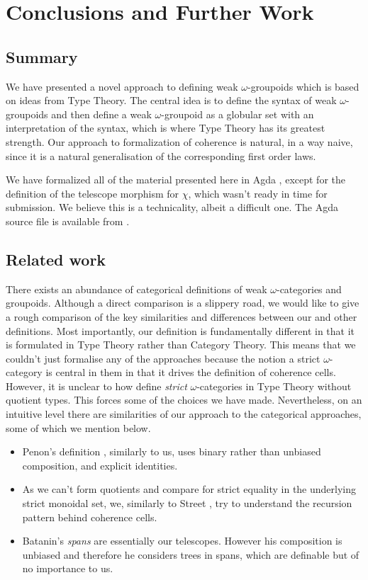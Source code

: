 \section{Conclusions and Further Work}
\label{sec:conclusions}

\subsection{Summary}
We have presented a novel approach to defining weak $\omega$-groupoids
which is based on ideas from Type Theory. The central idea is to
define the syntax of weak $\omega$-groupoids and then define a weak
$\omega$-groupoid as a globular set with an interpretation of the
syntax, which is where Type Theory has its greatest strength. Our
approach to formalization of coherence is natural, in a way naive,
since it is a natural generalisation of the corresponding first order
laws.

We have formalized all of the material presented here in Agda
\cite{agda}, except for the definition of the telescope morphism for
$\chi$, which wasn't ready in time for submission. We believe this is
a technicality, albeit a difficult one. The Agda source file is available
from \cite{coreagda}.


\subsection{Related work}
There exists an abundance of categorical definitions of weak
$\omega$-categories and groupoids.  Although a direct comparison is a
slippery road, we would like to give a rough comparison of the key
similarities and differences between our and other definitions. Most
importantly, our definition is fundamentally different in that it is
formulated in Type Theory rather than Category Theory. This means that
we couldn't just formalise any of the approaches
\cite{penon:1999,batanin98:monoidal-globular,leinster:2000} because
the notion a strict $\omega$-category is central in them in that it
drives the definition of coherence cells. However, it is unclear to how define
\emph{strict} $\omega$-categories in Type Theory
without quotient types. This forces some of the choices we have
made. Nevertheless, on an intuitive level there are similarities of our approach to the
categorical approaches, some of which we mention below.
\begin{itemize}
\item Penon's definition \cite{penon:1999}, similarly to us, uses
  binary rather than unbiased composition, and explicit
  identities. 
\item As we can't form quotients and compare for strict equality in
  the underlying strict monoidal set, we, similarly to Street
  \cite{street87:simplexes}, try to understand the recursion pattern
  behind coherence cells.
\item Batanin's \emph{spans} are essentially our telescopes. However
  his composition is unbiased and therefore he considers trees in
  spans, which are definable but of no importance to us.
\end{itemize}
%



